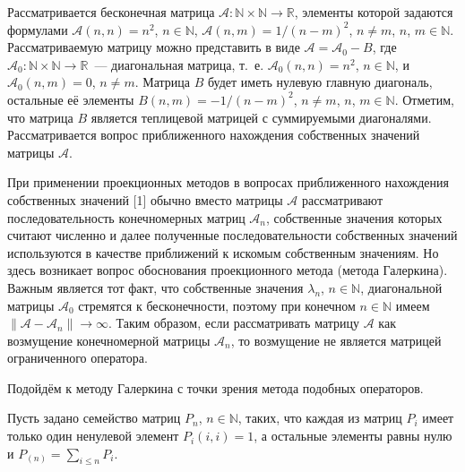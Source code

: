 \vzmscaption

Рассматривается бесконечная матрица $\mathcal{A}: \mathbb{N}\times\mathbb{N}\to\mathbb{R}$, элементы которой задаются
формулами $\mathcal{A}(n, n)=n^2$, $n\in\mathbb{N}$, $\mathcal{A}(n, m)=1/(n-m)^2$, $n\ne m$, $n$, $m\in\mathbb{N}$.
Рассматриваемую матрицу
можно представить в виде $\mathcal{A}=\mathcal{A}_0-B$, где $\mathcal{A}_0: \mathbb{N}\times\mathbb{N}\to\mathbb{R}$~---
диагональная матрица, т.~е. $\mathcal{A}_0(n, n)=n^2$, $n\in\mathbb{N}$, и $\mathcal{A}_0(n, m)=0$, $n\ne m$. Матрица
$B$ будет иметь нулевую главную диагональ, остальные её элементы $B(n, m)=-1/(n-m)^2$, $n\ne m$, $n$, $m\in\mathbb{N}$.
Отметим, что матрица $B$ является теплицевой матрицей с суммируемыми диагоналями. Рассматривается вопрос приближенного
нахождения собственных значений матрицы $\mathcal{A}$.

При применении проекционных методов в вопросах приближенного нахождения собственных значений [1] обычно вместо
матрицы $\mathcal{A}$ рассматривают последовательность конечномерных матриц $\mathcal{A}_n$, собственные значения которых \linebreak
считают численно и далее полученные последовательности собственных значений используются в качестве приближений к искомым
собственным значениям. Но здесь возникает вопрос обоснования проекционного метода (метода Галеркина). Важным является тот факт, что
собственные значения $\lambda_n$, $n\in\mathbb{N}$, диагональной матрицы $\mathcal{A}_0$ стремятся к бесконечности, поэтому
при конечном $n\in\mathbb{N}$ имеем $\|\mathcal{A}-\mathcal{A}_n\|\to\infty$. Таким образом, если рассматривать матрицу $\mathcal{A}$
как возмущение конечномерной матрицы $\mathcal{A}_n$, то возмущение не является матрицей ограниченного оператора.

Подойдём к методу Галеркина с точки зрения метода подобных операторов.

Пусть задано семейство матриц $P_n$, $n\in\mathbb{N}$, таких, что каждая из матриц $P_i$ имеет только один ненулевой элемент
$P_i(i, i)=1$, а остальные элементы равны нулю и $P_{(n)}=\sum_{i\leqslant n}P_i$.

